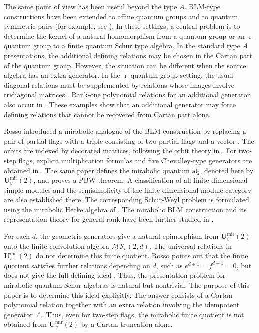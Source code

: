 \documentclass[12pt]{amsart}
\numberwithin{equation}{section}
\theoremstyle{definition}
\theoremstyle{definition}
\newcommand{\Umir}{\mathbf U^{\mathrm{mir}}_v(2)}
\newcommand{\MS}{\mathcal{MS}_v(2,d)}
\begin{document}
The same point of view has been useful beyond the type $A$. BLM-type constructions have been extended to affine quantum groups and to quantum symmetric pairs (for example, see \cite{DF15,BKLW18,LL21,DW22,FLLLW20,FLLLW23,LY26}). In these settings, a central problem is to determine the kernel of a natural homomorphism from a quantum group or an $\imath$-quantum group to a finite quantum Schur type algebra. 
In the standard type $A$ presentations, the additional defining relations may be chosen in the Cartan part of the quantum group. However, the situation can be different when the source algebra has an extra generator. 
In the $\imath$-quantum group setting, the usual diagonal relations must be supplemented by relations whose images involve tridiagonal matrices \cite{CD26}. Rank-one polynomial relations for an additional generator also occur in \cite{Li20}. 
These examples show that an additional generator may force defining relations that cannot be recovered from Cartan part alone.



Rosso introduced a mirabolic analogue of the BLM construction by replacing a pair of partial flags with a triple consisting of two partial flags and a vector \cite{Ros18}. The orbits are indexed by decorated matrices, following the orbit theory in \cite{MWZ99,Tra09}. 
For two-step flags, explicit multiplication formulas and five Chevalley-type generators are obtained in \cite{Ros18}. The same paper defines the mirabolic quantum $\mathfrak{sl}_2$, denoted here by $\Umir$, and proves a PBW theorem. A classification of all finite-dimensional simple modules and the semisimplicity of the finite-dimensional module category are also established there. The corresponding Schur-Weyl problem is formulated using the mirabolic Hecke algebra of \cite{Ros14}. 
The mirabolic BLM construction and its representation theory for general rank have been further studied in \cite{FZM25,GR26}.

For each $d$, the geometric generators give a natural epimorphism from $\Umir$ onto the finite convolution algebra $\MS$. 
The universal relations in $\Umir$ do not determine this finite quotient. Rosso points out that the finite quotient satisfies further relations depending on $d$, such as  $e^{d+1}=f^{d+1}=0$, but does not give the full defining ideal \cite[\S 4]{Ros18}. Thus, the presentation problem for mirabolic quantum Schur algebras is natural but nontrivial. 
The purpose of this paper is to determine this ideal explicitly.  
The answer consists of a Cartan polynomial relation together with an extra relation involving the idempotent generator $\ell$. 
Thus, even for two-step flags, the mirabolic finite quotient is not obtained from $\Umir$ by a Cartan truncation alone.
\end{document}
